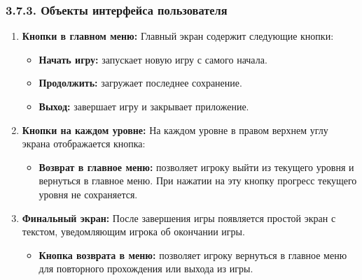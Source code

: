 \subsubsection*{3.7.3. Объекты интерфейса пользователя}

\begin{enumerate}
    \item \textbf{Кнопки в главном меню:}  
    Главный экран содержит следующие кнопки:  
    \begin{itemize}
        \item \textbf{Начать игру:} запускает новую игру с самого начала.  
        \item \textbf{Продолжить:} загружает последнее сохранение.  
        \item \textbf{Выход:} завершает игру и закрывает приложение.  
    \end{itemize}

    \item \textbf{Кнопки на каждом уровне:}  
    На каждом уровне в правом верхнем углу экрана отображается кнопка:  
    \begin{itemize}
        \item \textbf{Возврат в главное меню:} позволяет игроку выйти из текущего уровня и вернуться в главное меню. При нажатии на эту кнопку прогресс текущего уровня не сохраняется.  
    \end{itemize}

    \item \textbf{Финальный экран:}  
    После завершения игры появляется простой экран с текстом, уведомляющим игрока об окончании игры.  
    \begin{itemize}
        \item \textbf{Кнопка возврата в меню:} позволяет игроку вернуться в главное меню для повторного прохождения или выхода из игры.  
    \end{itemize}
\end{enumerate}